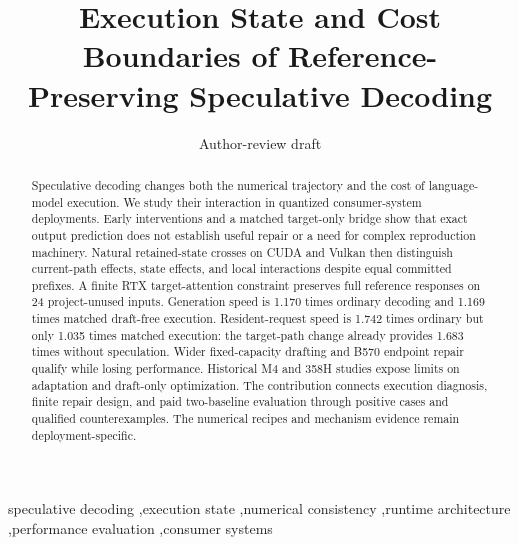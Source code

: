 \documentclass[preprint,12pt,nopreprintline]{elsarticle}
\begin{document}
\begin{frontmatter}
\title{Execution State and Cost Boundaries of Reference-Preserving Speculative Decoding}
\date{}
\author{Author-review draft}
\begin{abstract}
Speculative decoding changes both the numerical trajectory and the cost of language-model execution. We study their interaction in quantized consumer-system deployments. Early interventions and a matched target-only bridge show that exact output prediction does not establish useful repair or a need for complex reproduction machinery. Natural retained-state crosses on CUDA and Vulkan then distinguish current-path effects, state effects, and local interactions despite equal committed prefixes. A finite RTX target-attention constraint preserves full reference responses on 24 project-unused inputs. Generation speed is 1.170 times ordinary decoding and 1.169 times matched draft-free execution. Resident-request speed is 1.742 times ordinary but only 1.035 times matched execution: the target-path change already provides 1.683 times without speculation. Wider fixed-capacity drafting and B570 endpoint repair qualify while losing performance. Historical M4 and 358H studies expose limits on adaptation and draft-only optimization. The contribution connects execution diagnosis, finite repair design, and paid two-baseline evaluation through positive cases and qualified counterexamples. The numerical recipes and mechanism evidence remain deployment-specific.
\end{abstract}
\begin{keyword}
speculative decoding \sep execution state \sep numerical consistency \sep runtime architecture \sep performance evaluation \sep consumer systems
\end{keyword}
\end{frontmatter}









\label{maintextend}
\begingroup\small


\endgroup
\end{document}
